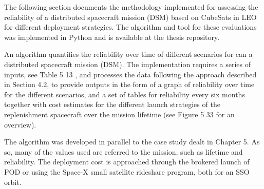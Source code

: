 The following section documents the methodology implemented for assessing the reliability of a distributed spacecraft mission (DSM) based on CubeSats in LEO for different deployment strategies. The algorithm and tool for these evaluations was implemented in Python and is available at the thesis repository.

An algorithm quantifies the reliability over time of different scenarios for can a distributed spacecraft mission (DSM). The implementation requires a series of inputs, see Table 5 13 , and processes the data following the approach described in Section 4.2, to provide outputs in the form of a graph of reliability over time for the different scenarios, and a set of tables for reliability every six months together with cost estimates for the different launch strategies of the replenishment spacecraft over the mission lifetime (see Figure 5 33 for an overview).


The algorithm was developed in parallel to the case study dealt in Chapter 5. As so, many of the values used are referred to the mission, such as lifetime and reliability. The deployment cost is approached through the brokered launch of POD or using the Space-X small satellite rideshare program, both for an SSO orbit.


